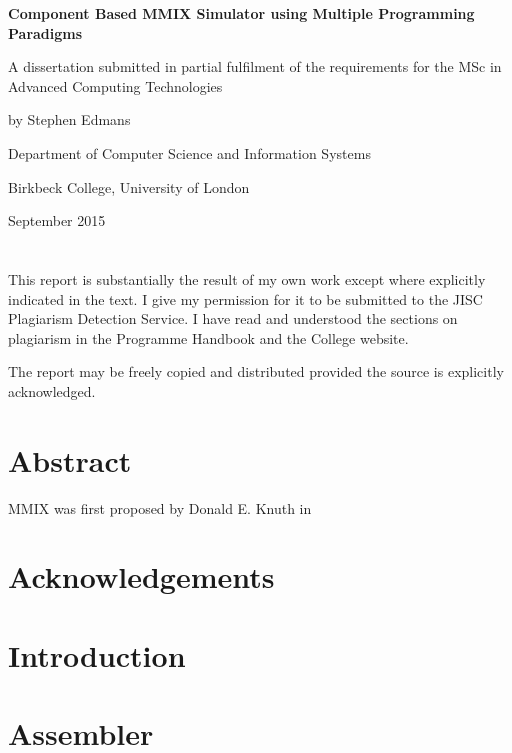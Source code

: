 \documentclass[a4paper,11pt]{report}
\begin{document}
\begin{titlepage}
	\centering
	{\bfseries Component Based MMIX Simulator using Multiple Programming Paradigms \par}
	\vspace{1cm}
	{A dissertation submitted in partial fulfilment of the requirements for the MSc in Advanced Computing Technologies\par}
	\vspace{1.5cm}
	{by Stephen Edmans\par}
	\vspace{2cm}
	{Department of Computer Science and Information Systems\par}
	{Birkbeck College, University of London\par}
	\vspace{2cm}
	{\large September 2015\par}
\end{titlepage}
\newpage
\chapter*{} %
{This report is substantially the result of my own work except where explicitly
indicated in the text. I give my permission for it to be submitted to the JISC
Plagiarism Detection Service. I have read and understood the sections on plagiarism
in the Programme Handbook and the College website.\par}
\vspace{1cm}
{\noindent The report may be freely copied and distributed provided the source is explicitly
acknowledged.}
\chapter*{Abstract}
MMIX was first proposed by Donald E. Knuth in \cite{knuth:aocp1}
\newpage
{}
\tableofcontents
\newpage
\listoffigures
\newpage
\chapter*{Acknowledgements}
\chapter{Introduction}
\chapter{Assembler}
\end{document}
